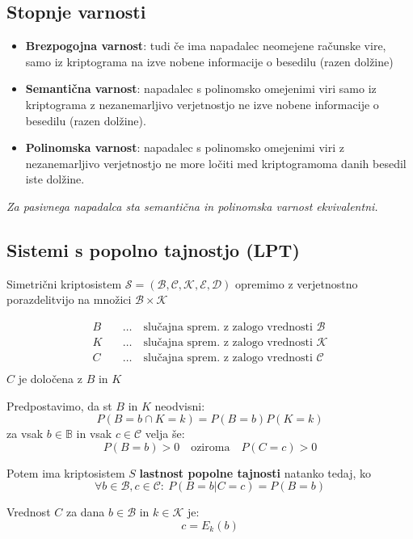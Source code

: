 \begin{multicols}{5}
\subsection*{Stopnje varnosti}
\begin{itemize}
	\item \textbf{Brezpogojna varnost}: tudi če ima napadalec neomejene računske vire, samo iz kriptograma na izve nobene informacije o besedilu (razen dolžine)
	\item \textbf{Semantična varnost}: napadalec s polinomsko omejenimi viri samo iz kriptograma z nezanemarljivo verjetnostjo ne izve nobene informacije o besedilu (razen dolžine).
	\item \textbf{Polinomska varnost}: napadalec s polinomsko omejenimi viri z nezanemarljivo verjetnostjo ne more ločiti med kriptogramoma danih besedil iste dolžine.
\end{itemize}
\textit{Za pasivnega napadalca sta semantična in polinomska varnost ekvivalentni.}

\subsection*{Sistemi s popolno tajnostjo (LPT)}
Simetrični kriptosistem $\mathcal{S} = (\mathcal{B}, \mathcal{C}, \mathcal{K}, \mathcal{E}, \mathcal{D})$ opremimo
z verjetnostno porazdelitvijo na množici $\mathcal{B} \times \mathcal{K}$

\begin{align*}
	B \quad &\dots \quad \text{slučajna sprem. z zalogo vrednosti } \mathcal{B} \\
	K \quad &\dots \quad \text{slučajna sprem. z zalogo vrednosti } \mathcal{K} \\
	C \quad &\dots \quad \text{slučajna sprem. z zalogo vrednosti } \mathcal{C} \\
\end{align*}
$C$ je določena z $B$ in $K$

Predpostavimo, da st $B$ in $K$ neodvisni:
\[ P(B = b \cap K = k) = P(B = b) P(K = k) \]
za vsak $b \in \mathbb{B}$ in vsak $c \in \mathcal{C}$ velja še:
\[ P(B = b) > 0 \quad \text{oziroma} \quad P(C = c) > 0 \]

Potem ima kriptosistem $S$ \textbf{lastnost popolne tajnosti} natanko tedaj, ko
\[ \forall b \in \mathcal{B}, c \in \mathcal{C}: \ P(B = b | C = c) = P(B = b)\]

Vrednost $C$ za dana $b \in \mathcal{B}$ in $k \in \mathcal{K}$ je:
\[ c = E_k(b) \]


\end{multicols}
